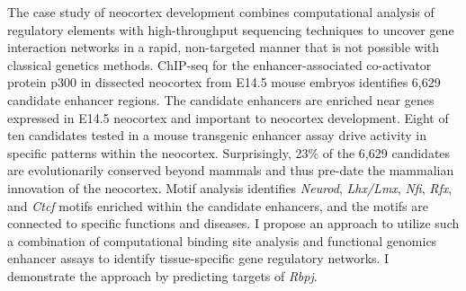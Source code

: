 The case study of neocortex development combines computational analysis of
regulatory elements with high-throughput sequencing techniques to uncover
gene interaction networks in a rapid, non-targeted manner that is not
possible with classical genetics methods.  ChIP-seq for the enhancer-associated
co-activator protein p300 in dissected neocortex from E14.5 mouse embryos
identifies 6,629 candidate enhancer regions.  The candidate enhancers are
enriched near genes expressed in E14.5 neocortex and important to neocortex development.
Eight of ten candidates tested in a mouse transgenic enhancer assay drive activity in
specific patterns within the neocortex.  Surprisingly, 23\% of the 6,629 candidates
are evolutionarily conserved beyond mammals and thus pre-date the mammalian innovation of
the neocortex.  Motif analysis identifies \textit{Neurod}, \textit{Lhx/Lmx}, \textit{Nfi},
\textit{Rfx}, and \textit{Ctcf}
motifs enriched within the candidate enhancers, and the motifs are connected to specific
functions and diseases.  I propose an approach to utilize such a combination of
computational binding site analysis and functional genomics enhancer assays
to identify tissue-specific gene regulatory networks.  I demonstrate the approach by
predicting targets of \textit{Rbpj}.

